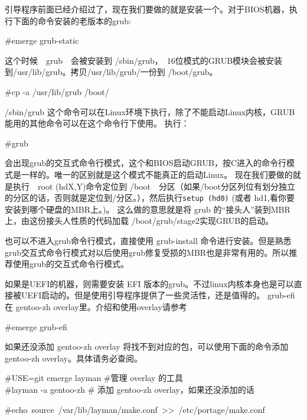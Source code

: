 引导程序前面已经介绍过了，现在我们要做的就是安装一个。对于BIOS机器，执行下面的命令安装的老版本的grub:

\begin{code}
\#emerge grub-static
\end{code}

这个时候　grub　会被安装到 /sbin/grub，　16位模式的GRUB模块会被安装到/usr/lib/grub。拷贝/usr/lib/grub/一份到 /boot/grub。

\begin{code}
\#cp -a /usr/lib/grub /boot/
\end{code}

/sbin/grub 这个命令可以在Linux环境下执行，除了不能启动Linux内核，GRUB能用的其他命令可以在这个命令行下使用。
执行：
\begin{code}
\#grub
\end{code}

会出现grub的交互式命令行模式，这个和BIOS启动GRUB，按C进入的命令行模式是一样的。唯一的区别就是这个模式不能真正的启动Linux。
现在我们要做的就是执行　root (hdX,Y)命令定位到 /boot　分区（如果/boot分区列位有划分独立的分区的话，否则就是定位到/分区。），然后执行{\tt setup (hd0)} (或者 hd1,看你要安装到哪个硬盘的MBR上。)。
这么做的意思就是将 grub 的“接头人”装到MBR上，由这份接头人性质的代码加载 /boot/grub/stage2实现GRUB的启动。

也可以不进入grub命令行模式，直接使用 grub-install 命令进行安装。但是熟悉grub交互式命令行模式对以后使用grub修复受损的MBR也是非常有用的。所以推荐使用grub的交互式命令行模式。

如果是UEFI的机器，则需要安装 EFI 版本的grub。不过linux内核本身也是可以直接被UEFI启动的。但是使用引导程序提供了一些灵活性，还是值得的。
grub-efi 在 gentoo-zh overlay里。介绍和使用overlay请参考 

\begin{code}
\#emerge grub-efi
\end{code}

如果还没添加 gentoo-zh overlay 将找不到对应的包，可以使用下面的命令添加 gentoo-zh overlay。具体请务必查阅。

\begin{code}
\#USE=git emerge layman \#管理 overlay 的工具\\

\#layman -a gentoo-zh \# 添加 gentoo-zh overlay，如果还没添加的话 

\#echo~source~/var/lib/layman/make.conf~>>~/etc/portage/make.conf
\end{code}

